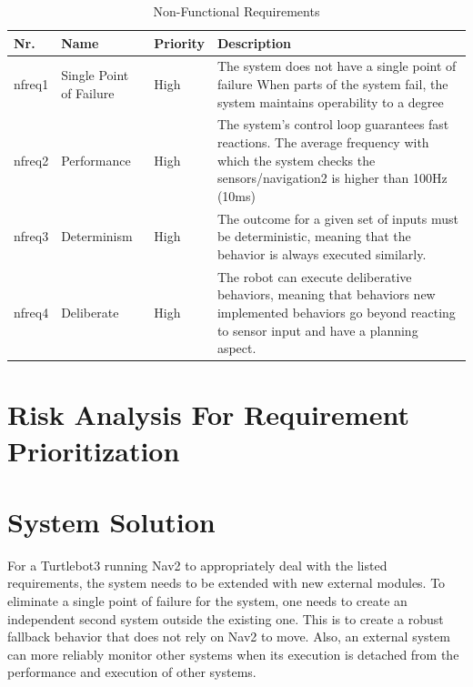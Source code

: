 \begin{table}[h!]
	\caption{Non-Functional Requirements}
	\begin{tabular}{ | m{} | m{}| m{} | m{} |} 
  	\hline
  	Nr. & Name & Priority & Description \\ 
  	\hline
  	nfreq1 & Single Point of Failure & High &  The system does not have a single point of failure	When parts of the system fail, the system maintains operability to a degree \\ 
  	\hline
  	nfreq2 & Performance & High & The system's control loop guarantees fast reactions. The average frequency with which the system checks the sensors/navigation2 is higher than 100Hz (10ms) \\ 
  	\hline
  	nfreq3 & Determinism & High & The outcome for a given set of inputs must be deterministic, meaning that the behavior is always executed similarly. \\
  	\hline
  	nfreq4 & Deliberate & High & The robot can execute deliberative behaviors, meaning that behaviors new implemented behaviors go beyond reacting to sensor input and have a planning aspect. \\
  	\hline
	\end{tabular}
\end{table}


\newpage

\section{Risk Analysis For Requirement Prioritization}

\section{System Solution}

For a Turtlebot3 running Nav2 to appropriately deal with the listed requirements, the system needs to be extended with new external modules. To eliminate a single point of failure for the system, one needs to create an independent second system outside the existing one. This is to create a robust fallback behavior that does not rely on Nav2 to move. Also, an external system can more reliably monitor other systems when its execution is detached from the performance and execution of other systems. 

